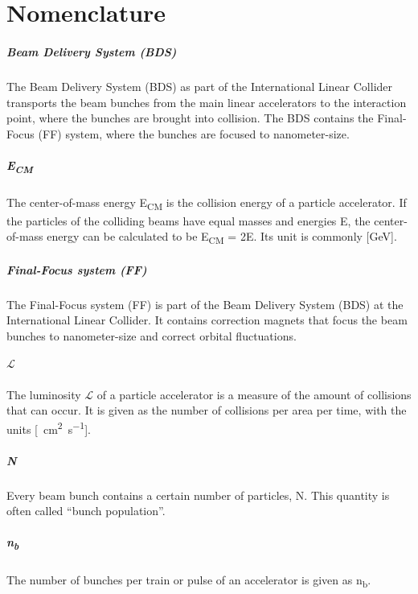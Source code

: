 \chapter*{Nomenclature} 
\paragraph{Beam Delivery System (BDS)}
The Beam Delivery System (BDS) as part of the International Linear Collider transports the beam bunches from the main linear accelerators to the interaction point, where the bunches are brought into collision.
The BDS contains the Final-Focus (FF) system, where the bunches are focused to nanometer-size.
\paragraph{E\textsubscript{CM}}
The center-of-mass energy E\textsubscript{CM} is the collision energy of a particle accelerator.
If the particles of the colliding beams have equal masses and energies E, the center-of-mass energy can be calculated to be E\textsubscript{CM} = 2E. Its unit is commonly [\si{\GeV}].
\paragraph{Final-Focus system (FF)}
The Final-Focus system (FF) is part of the Beam Delivery System (BDS) at the International Linear Collider.
It contains correction magnets that focus the beam bunches to nanometer-size and correct orbital fluctuations.
\paragraph{$\bm{\mathcal{L}}$}
The luminosity $\mathcal{L}$ of a particle accelerator is a measure of the amount of collisions that can occur. It is given as the number of collisions per area per time, with the units [\si{\per\centi\meter\squared\per\second}].
\paragraph{N}
Every beam bunch contains a certain number of particles, N. This quantity is often called ``bunch population''.
\paragraph{n\textsubscript{b}}
The number of bunches per train or pulse of an accelerator is given as n\textsubscript{b}.
